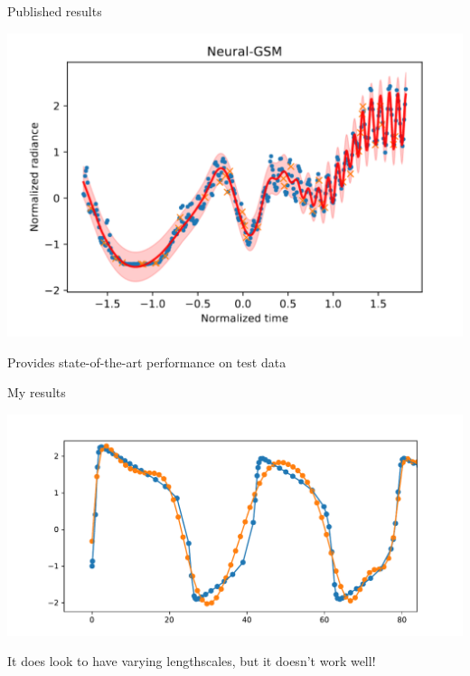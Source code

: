 \documentclass[presentation]{beamer}
\begin{document}
\begin{frame}[plain,label={sec:org7293dee}]{Published results}
\begin{center}
\includegraphics[width=.9\linewidth]{./niceplot.png}
\end{center}

Provides state-of-the-art performance on test data
\end{frame}

\begin{frame}[plain,label={sec:org2e5337a}]{My results}
\begin{center}
\includegraphics[width=\textwidth]{./neural_gsm.pdf}
\end{center}

It does look to have varying lengthscales, but it doesn't work well!
\end{frame}
\end{document}
